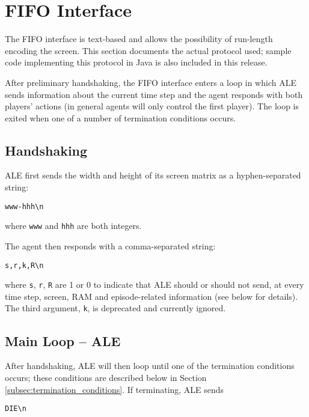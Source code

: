 \documentclass[12pt]{article}
\begin{document}
\section{FIFO Interface}\label{sec:pipes_interface}

The FIFO interface is text-based and allows the possibility of run-length encoding the screen. This section documents the actual protocol used; sample code implementing this protocol in Java is also included in this release.

After preliminary handshaking, the FIFO interface enters a loop in which ALE sends information about the current time step and the agent responds with both players' actions (in general agents will only control the first player). The loop is exited when one of a number of termination conditions occurs.

\subsection{Handshaking}

ALE first sends the width and height of its screen matrix as a hyphen-separated string:

\begin{verbatim}
www-hhh\n
\end{verbatim}

where \verb+www+ and \verb+hhh+ are both integers.

The agent then responds with a comma-separated string:

\begin{verbatim}
s,r,k,R\n
\end{verbatim}

where \verb+s+, \verb+r+, \verb+R+ are 1 or 0 to indicate that ALE should or should not send, at every time step, screen, RAM and episode-related information (see below for details). The third argument, \verb+k+, is deprecated and currently ignored.

\subsection{Main Loop -- ALE}

After handshaking, ALE will then loop until one of the termination conditions occurs; these conditions are described below in Section \ref{subsec:termination_conditions}. If terminating, ALE sends

\begin{verbatim}
DIE\n
\end{verbatim}
\end{document}

